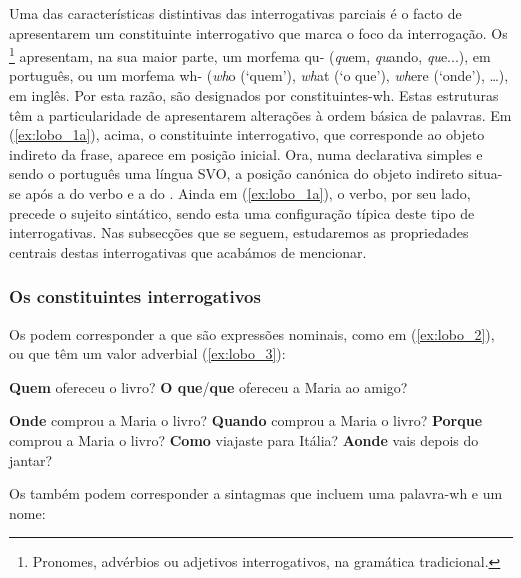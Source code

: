 \documentclass[output=paper]{LSP/langsci}
\begin{document}
Uma das características distintivas das interrogativas parciais é o facto de apresentarem um constituinte interrogativo que marca o foco da interrogação. Os \footnote{Pronomes, advérbios ou adjetivos interrogativos, na gramática tradicional.} apresentam, na sua maior parte, um morfema qu- (\textit{qu}em, \textit{qu}ando, \textit{qu}e...), em português, ou um morfema wh- (\textit{wh}o (‘quem’), \textit{wh}at (‘o que’), \textit{wh}ere (‘onde’), \ldots), em inglês. Por esta razão, são designados por cons\-ti\-tu\-in\-tes-wh. Estas estruturas têm a particularidade de apresentarem alterações à ordem básica de palavras. Em (\ref{ex:lobo_1a}), acima, o constituinte interrogativo, que corresponde ao objeto indireto da frase, aparece em posição inicial. Ora, numa declarativa simples e sendo o português uma língua SVO, a posição canónica do objeto indireto situa-se após a do verbo e a do . Ainda em (\ref{ex:lobo_1a}), o verbo, por seu lado, precede o sujeito sintático, sendo esta uma configuração típica deste tipo de interrogativas. Nas subsecções que se seguem, estudaremos as propriedades centrais destas interrogativas que acabámos de mencionar.

\subsubsection{Os constituintes interrogativos}
\label{subsubsec:lobo_constituintes_int}

Os  podem corresponder a  que são expressões nominais, como em (\ref{ex:lobo_2}), ou que têm um valor adverbial (\ref{ex:lobo_3}):

\ea\label{ex:lobo_2}
\ea\label{ex:lobo_2a} \textbf{Quem} ofereceu o livro?
\ex\label{ex:lobo_2b} \textbf{O que}/\textbf{que}{\footnotemark} ofereceu a Maria ao amigo?
\zl

\ea\label{ex:lobo_3}
\ea\label{ex:lobo_3a} \textbf{Onde} comprou a Maria o livro?
\ex\label{ex:lobo_3b} \textbf{Quando} comprou a Maria o livro?
\ex\label{ex:lobo_3c} \textbf{Porque} comprou a Maria o livro?
\ex\label{ex:lobo_3d} \textbf{Como} viajaste para Itália?
\ex\label{ex:lobo_3e} \textbf{Aonde} vais depois do jantar?
\zl

Os  também podem corresponder a sintagmas que incluem uma palavra-wh e um nome:
\end{document}
